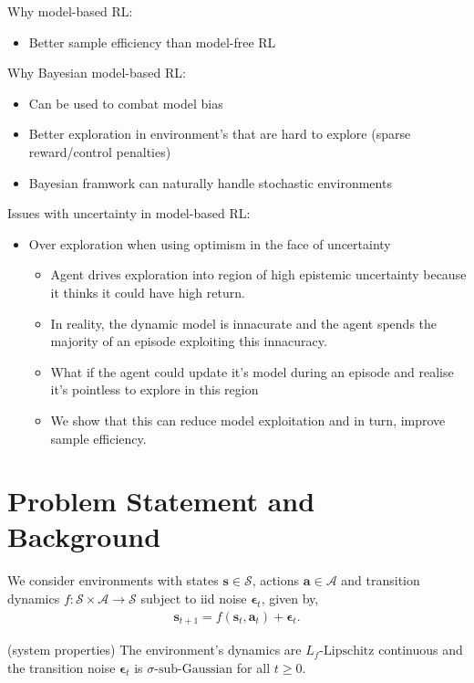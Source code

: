 \documentclass{article}
\newcommand{\state}{\ensuremath{\mathbf{s}}}
\newcommand{\action}{\ensuremath{\mathbf{a}}}
\newcommand{\noise}{\ensuremath{\bm\epsilon}}
\newcommand{\stateDomain}{\ensuremath{\mathcal{S}}}
\newcommand{\actionDomain}{\ensuremath{\mathcal{A}}}
\newcommand{\transitionFn}{\ensuremath{f}}
\begin{document}
Why model-based RL:
\begin{itemize}
  \item Better sample efficiency than model-free RL
\end{itemize}

Why Bayesian model-based RL:
\begin{itemize}
  \item Can be used to combat model bias
  \item Better exploration in environment's that are hard to explore (sparse reward/control penalties)
  \item Bayesian framwork can naturally handle stochastic environments
\end{itemize}

Issues with uncertainty in model-based RL:
\begin{itemize}
  \item Over exploration when using optimism in the face of uncertainty
  \begin{itemize}
    \item Agent drives exploration into region of high epistemic uncertainty because it thinks it could have high return.
    \item In reality, the dynamic model is innacurate and the agent spends the majority of an episode exploiting this innacuracy.
    \item What if the agent could update it's model during an episode and realise it's pointless to explore in this region
    \item We show that this can reduce model exploitation and in turn, improve sample efficiency.
  \end{itemize}
\end{itemize}

\section{Problem Statement and Background} \label{sec:problem-statement}
We consider environments with states \(\state \in \stateDomain \), actions \(\action \in \actionDomain\) and transition dynamics \(\transitionFn: \stateDomain \times \actionDomain \rightarrow \stateDomain \) subject to
iid noise \(\noise_{t}\), given by,
\begin{align}
\state_{t+1} = \transitionFn(\state_{t}, \action_{t}) + \noise_{t}.
\end{align}
\begin{assumption}
  (system properties) The environment's dynamics are $L_{\transitionFn}\text{-Lipschitz}$ continuous and the transition noise $\noise_{t}$ is $\sigma\text{-sub-Gaussian}$ for all $t \geq 0$.
\end{assumption}
\end{document}
